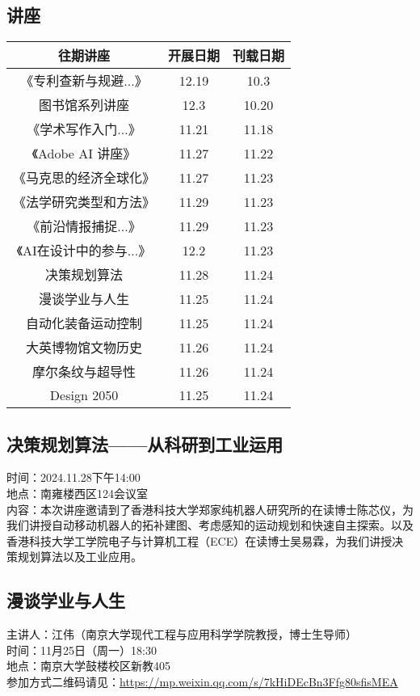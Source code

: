 \documentclass[letterpaper, 12pt]{article}
\begin{document}
\begin{multicols}{2}

\section{讲座}
\begin{tabular}{|c|c|c|}
    \hline
    往期讲座 & 开展日期 & 刊载日期\\
    \hline\hline
    《专利查新与规避...》 & 12.19 & 10.3\\
    图书馆系列讲座 & 12.3 & 10.20\\
    《学术写作入门...》& 11.21 & 11.18\\
    《Adobe AI 讲座》 & 11.27 & 11.22\\
    《马克思的经济全球化》 & 11.27 & 11.23\\
    《法学研究类型和方法》 & 11.29 & 11.23\\
    《前沿情报捕捉...》 & 11.29 & 11.23\\
    《AI在设计中的参与...》 & 12.2 & 11.23\\
    决策规划算法 & 11.28 & 11.24\\
    漫谈学业与人生 & 11.25 & 11.24\\
    自动化装备运动控制 & 11.25 & 11.24\\
    大英博物馆文物历史 & 11.26 & 11.24\\
    摩尔条纹与超导性 & 11.26 & 11.24\\
    Design 2050 & 11.25 & 11.24\\
    \hline
\end{tabular}

\subsection{决策规划算法——从科研到工业运用}
时间：2024.11.28下午14:00\\
地点：南雍楼西区124会议室\\
内容：本次讲座邀请到了香港科技大学郑家纯机器人研究所的在读博士陈芯仪，为我们讲授自动移动机器人的拓补建图、考虑感知的运动规划和快速自主探索。以及香港科技大学工学院电子与计算机工程（ECE）在读博士吴易霖，为我们讲授决策规划算法以及工业应用。\\

\subsection{漫谈学业与人生}
主讲人：江伟（南京大学现代工程与应用科学学院教授，博士生导师）\\
时间：11月25日（周一）18:30\\
地点：南京大学鼓楼校区新教405\\
参加方式二维码请见：\url{https://mp.weixin.qq.com/s/7kHiDEcBn3Ffg80sfisMEA}\\


\end{multicols}
\end{document}
